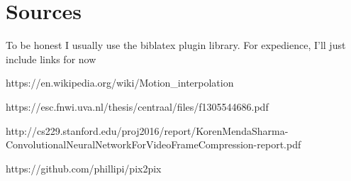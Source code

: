 \documentclass{article}
\begin{document}
\section{Sources}
To be honest I usually use the biblatex plugin library. For expedience, I'll just include links for now

https://en.wikipedia.org/wiki/Motion_interpolation

https://esc.fnwi.uva.nl/thesis/centraal/files/f1305544686.pdf

http://cs229.stanford.edu/proj2016/report/KorenMendaSharma-ConvolutionalNeuralNetworkForVideoFrameCompression-report.pdf

https://github.com/phillipi/pix2pix
\end{document}
